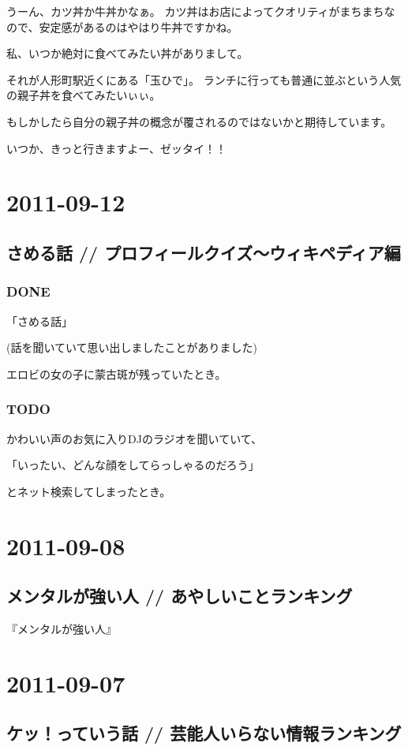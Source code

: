 \documentclass[11pt]{article}
\begin{document}
うーん、カツ丼か牛丼かなぁ。
カツ丼はお店によってクオリティがまちまちなので、安定感があるのはやはり牛丼ですかね。

私、いつか絶対に食べてみたい丼がありまして。

それが人形町駅近くにある「玉ひで」。
ランチに行っても普通に並ぶという人気の親子丼を食べてみたいぃぃ。

もしかしたら自分の親子丼の概念が覆されるのではないかと期待しています。

いつか、きっと行きますよー、ゼッタイ！！
\section{2011-09-12}
\label{sec-71}
\subsection{さめる話 // プロフィールクイズ～ウィキペディア編}
\label{sec-71_1}
\subsubsection{\textbf{DONE}}
\label{sec-71_1_1}

「さめる話」

(話を聞いていて思い出しましたことがありました)

エロビの女の子に蒙古斑が残っていたとき。
\subsubsection{\textbf{TODO}}
\label{sec-71_1_2}

かわいい声のお気に入りDJのラジオを聞いていて、

「いったい、どんな顔をしてらっしゃるのだろう」

とネット検索してしまったとき。
\section{2011-09-08}
\label{sec-72}
\subsection{メンタルが強い人 // あやしいことランキング}
\label{sec-72_1}

『メンタルが強い人』
\section{2011-09-07}
\label{sec-73}
\subsection{ケッ！っていう話 // 芸能人いらない情報ランキング}
\label{sec-73_1}
\end{document}
